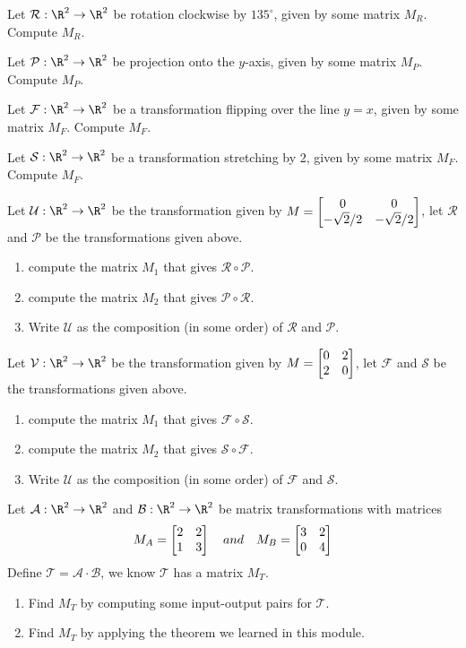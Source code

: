 \begin{exercises}
	\begin{problist}
	    \prob Let $\mathcal R:\R^2\to\R^2$ be rotation clockwise by $135^\circ$, given by some matrix $M_R$. Compute $M_R$.
	    
	    \prob Let $\mathcal P:\R^2\to\R^2$ be projection onto the $y$-axis, given by some matrix $M_P$. Compute $M_P$.
	    
	    \prob Let $\mathcal F:\R^2\to\R^2$ be a transformation flipping over the line $y=x$, given by some matrix $M_F$. Compute $M_F$.
	    
	    \prob Let $\mathcal S:\R^2\to\R^2$ be a transformation stretching by 2, given by some matrix $M_F$. Compute $M_F$.
	
		\prob Let $\mathcal U:\R^2\to\R^2$ be the transformation given by $M=\begin{bmatrix}0&0\\-\sqrt{2}/2 & -\sqrt{2}/2\end{bmatrix}$, let $\mathcal R$ and $\mathcal P$ be the transformations given above.
		\begin{enumerate}
			\item   compute the matrix $M_1$ that gives $\mathcal R \circ \mathcal P$.
			\item   compute the matrix $M_2$ that gives $\mathcal P \circ \mathcal R$.
			\item   Write $\mathcal U$ as the composition (in some order) of $\mathcal R$ and $\mathcal P$.
		\end{enumerate}
		
		\prob Let $\mathcal V:\R^2\to\R^2$ be the transformation given by $M=\begin{bmatrix}0&2\\2&0\end{bmatrix}$, let $\mathcal F$ and $\mathcal S$ be the transformations given above.
		\begin{enumerate}
			\item   compute the matrix $M_1$ that gives $\mathcal F \circ \mathcal S$.
			\item   compute the matrix $M_2$ that gives $\mathcal S \circ \mathcal F$.
			\item   Write $\mathcal U$ as the composition (in some order) of $\mathcal F$ and $\mathcal S$.
		\end{enumerate}
		    
		\prob Let $\mathcal A: \R^2 \to \R^2$ and $\mathcal B: \R^2 \to \R^2$ be matrix transformations with matrices
		\[
		    M_A = \begin{bmatrix}2&2\\1&3\end{bmatrix} \quad and \quad M_B = \begin{bmatrix}3&2\\0&4\end{bmatrix}
		\]
		Define $\mathcal T = \mathcal A \cdot \mathcal B$, we know $\mathcal T$ has a matrix $M_T$. 
		\begin{enumerate}
		    \item Find $M_T$ by computing some input-output pairs for $\mathcal T$.
		    \item Find $M_T$ by applying the theorem we learned in this module. 
		\end{enumerate}
		

\end{problist}
\end{exercises}
